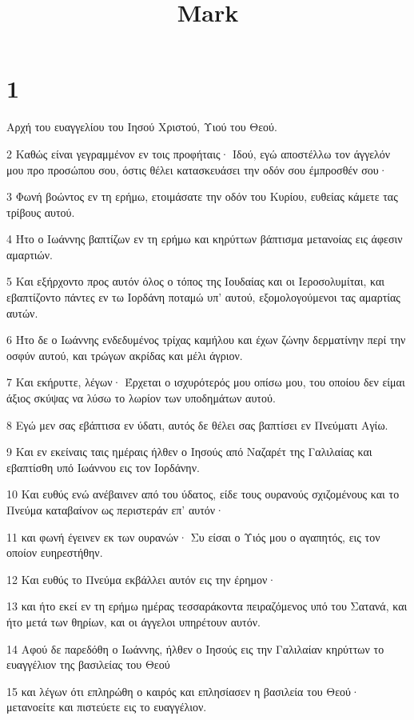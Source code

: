

\title{Mark}


\chapter{1}

\par Αρχή του ευαγγελίου του Ιησού Χριστού, Υιού του Θεού.
\par 2 Καθώς είναι γεγραμμένον εν τοις προφήταις· Ιδού, εγώ αποστέλλω τον άγγελόν μου προ προσώπου σου, όστις θέλει κατασκευάσει την οδόν σου έμπροσθέν σου·
\par 3 Φωνή βοώντος εν τη ερήμω, ετοιμάσατε την οδόν του Κυρίου, ευθείας κάμετε τας τρίβους αυτού.
\par 4 Ήτο ο Ιωάννης βαπτίζων εν τη ερήμω και κηρύττων βάπτισμα μετανοίας εις άφεσιν αμαρτιών.
\par 5 Και εξήρχοντο προς αυτόν όλος ο τόπος της Ιουδαίας και οι Ιεροσολυμίται, και εβαπτίζοντο πάντες εν τω Ιορδάνη ποταμώ υπ' αυτού, εξομολογούμενοι τας αμαρτίας αυτών.
\par 6 Ήτο δε ο Ιωάννης ενδεδυμένος τρίχας καμήλου και έχων ζώνην δερματίνην περί την οσφύν αυτού, και τρώγων ακρίδας και μέλι άγριον.
\par 7 Και εκήρυττε, λέγων· Έρχεται ο ισχυρότερός μου οπίσω μου, του οποίου δεν είμαι άξιος σκύψας να λύσω το λωρίον των υποδημάτων αυτού.
\par 8 Εγώ μεν σας εβάπτισα εν ύδατι, αυτός δε θέλει σας βαπτίσει εν Πνεύματι Αγίω.
\par 9 Και εν εκείναις ταις ημέραις ήλθεν ο Ιησούς από Ναζαρέτ της Γαλιλαίας και εβαπτίσθη υπό Ιωάννου εις τον Ιορδάνην.
\par 10 Και ευθύς ενώ ανέβαινεν από του ύδατος, είδε τους ουρανούς σχιζομένους και το Πνεύμα καταβαίνον ως περιστεράν επ' αυτόν·
\par 11 και φωνή έγεινεν εκ των ουρανών· Συ είσαι ο Υιός μου ο αγαπητός, εις τον οποίον ευηρεστήθην.
\par 12 Και ευθύς το Πνεύμα εκβάλλει αυτόν εις την έρημον·
\par 13 και ήτο εκεί εν τη ερήμω ημέρας τεσσαράκοντα πειραζόμενος υπό του Σατανά, και ήτο μετά των θηρίων, και οι άγγελοι υπηρέτουν αυτόν.
\par 14 Αφού δε παρεδόθη ο Ιωάννης, ήλθεν ο Ιησούς εις την Γαλιλαίαν κηρύττων το ευαγγέλιον της βασιλείας του Θεού
\par 15 και λέγων ότι επληρώθη ο καιρός και επλησίασεν η βασιλεία του Θεού· μετανοείτε και πιστεύετε εις το ευαγγέλιον.
